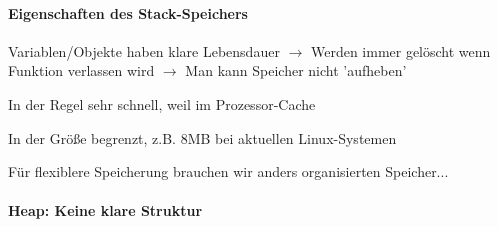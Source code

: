 \documentclass[10pt]{article}
\begin{document}
\paragraph{Eigenschaften des Stack-Speichers}

\begin{itemize*}
  \item Variablen/Objekte haben klare Lebensdauer $\rightarrow$ Werden immer gelöscht wenn Funktion verlassen wird  $\rightarrow$ Man kann Speicher nicht 'aufheben'
  \item In der Regel sehr schnell, weil im Prozessor-Cache
  \item In der Größe begrenzt, z.B. 8MB bei aktuellen Linux-Systemen
  \item Für flexiblere Speicherung brauchen wir anders organisierten Speicher...
\end{itemize*}

\paragraph{Heap: Keine klare Struktur}
\end{document}
